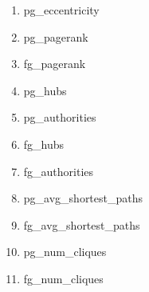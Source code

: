\documentclass[12pt]{report}
\begin{document}
\begin{multicols}{2}
\begin{enumerate}
	\item pg\_eccentricity
	\item pg\_pagerank
	\item fg\_pagerank
	\item pg\_hubs
	\item pg\_authorities
	\item fg\_hubs
	\item fg\_authorities
	\item pg\_avg\_shortest\_paths
	\item fg\_avg\_shortest\_paths
	\item pg\_num\_cliques
	\item fg\_num\_cliques
\end{enumerate}
\end{multicols}
\end{document}
